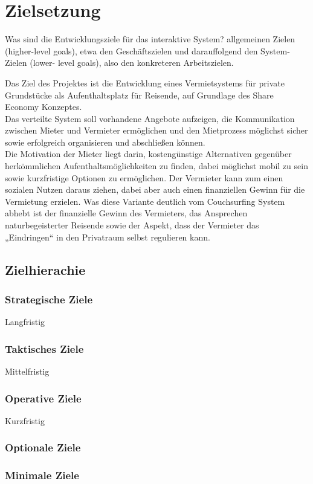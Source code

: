 
\section{Zielsetzung}
Was sind die Entwicklungsziele für das interaktive System?
allgemeinen Zielen (higher-level goals), etwa den Geschäftszielen und darauffolgend  
den System-Zielen (lower- level goals), also den konkreteren Arbeitszielen.
 
Das Ziel des Projektes  ist die Entwicklung eines Vermietsystems für private Grundstücke als Aufenthaltsplatz für Reisende, auf Grundlage des Share Economy Konzeptes.\\
Das verteilte System soll vorhandene Angebote aufzeigen, die Kommunikation zwischen Mieter und Vermieter ermöglichen und den Mietprozess möglichst sicher sowie erfolgreich organisieren und abschließen können.\\
Die Motivation der Mieter liegt darin, kostengünstige Alternativen gegenüber herkömmlichen Aufenthaltsmöglichkeiten zu finden, dabei möglichst mobil zu sein sowie kurzfristige Optionen zu ermöglichen. Der Vermieter kann zum einen sozialen Nutzen daraus ziehen, dabei aber auch einen finanziellen Gewinn für die Vermietung erzielen. Was diese Variante deutlich vom Couchsurfing System abhebt ist der finanzielle Gewinn des Vermieters, das Ansprechen naturbegeisterter Reisende sowie der Aspekt, dass der Vermieter das „Eindringen“ in den Privatraum selbst regulieren kann.
 
\subsection{Zielhierachie}

\subsubsection{Strategische Ziele}
Langfristig

\subsubsection{Taktisches Ziele}
Mittelfristig

\subsubsection{Operative Ziele}
Kurzfristig

\subsubsection{Optionale Ziele}

\subsubsection{Minimale Ziele}

